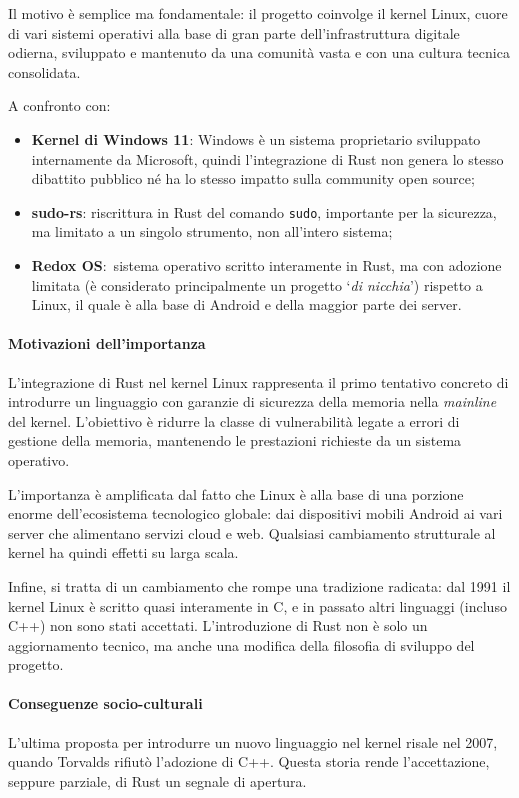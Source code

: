 Il motivo è semplice ma fondamentale: il progetto coinvolge il kernel Linux, cuore di vari sistemi operativi alla base di gran parte 
dell'infrastruttura digitale odierna, sviluppato e mantenuto da una comunità vasta e con una cultura tecnica consolidata.

A confronto con:
\begin{itemize}
    \item \textbf{Kernel di Windows 11}: Windows è un sistema proprietario sviluppato internamente da Microsoft, quindi l'integrazione di Rust non genera lo stesso dibattito pubblico né ha lo stesso impatto sulla community open source;
    \item \textbf{sudo-rs}: riscrittura in Rust del comando \texttt{sudo}, importante per la sicurezza, ma limitato a un singolo strumento, non all'intero sistema;
    \item \textbf{Redox OS}:\  sistema operativo scritto interamente in Rust, ma con adozione limitata (è considerato principalmente un progetto `\textit{di nicchia}') rispetto a Linux, il quale è alla base di Android e della maggior parte dei server.
\end{itemize}

\paragraph{Motivazioni dell'importanza}
L'integrazione di Rust nel kernel Linux rappresenta il primo tentativo concreto di introdurre un linguaggio con garanzie di sicurezza della memoria nella \textit{mainline} del kernel.
L'obiettivo è ridurre la classe di vulnerabilità legate a errori di gestione della memoria, mantenendo le prestazioni richieste da un sistema operativo.

L'importanza è amplificata dal fatto che Linux è alla base di una porzione enorme dell'ecosistema tecnologico globale: dai dispositivi mobili Android ai 
vari server che alimentano servizi cloud e web. Qualsiasi cambiamento strutturale al kernel ha quindi effetti su larga scala.

Infine, si tratta di un cambiamento che rompe una tradizione radicata: dal 1991 il kernel Linux è scritto quasi interamente in C, e in passato 
altri linguaggi (incluso C++) non sono stati accettati. L'introduzione di Rust non è solo un aggiornamento tecnico, ma anche una 
modifica della filosofia di sviluppo del progetto.

\paragraph{Conseguenze socio-culturali}
L'ultima proposta per introdurre un nuovo linguaggio nel kernel risale nel 2007, quando Torvalds rifiutò l'adozione di C++. 
Questa storia rende l'accettazione, seppure parziale, di Rust un segnale di apertura.

